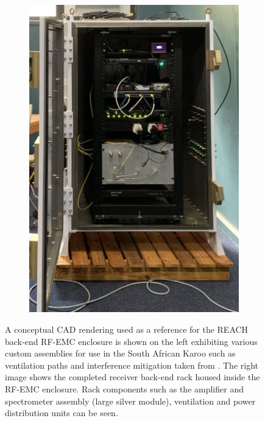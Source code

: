 \begin{figure}
\begin{subfigure}{.4\textwidth}
        \includegraphics[width=\linewidth]{backend}
    \end{subfigure}
    \caption{A conceptual CAD rendering used as a reference for the REACH back-end RF-EMC enclosure is shown on the left exhibiting various custom assemblies for use in the South African Karoo such as ventilation paths and interference mitigation taken from \citet{hera_enclosure}. The right image shows the completed receiver back-end rack housed inside the RF-EMC enclosure. Rack components such as the amplifier and spectrometer assembly (large silver module), ventilation and power distribution units can be seen.}
    \label{fig:backend}
\end{figure}

